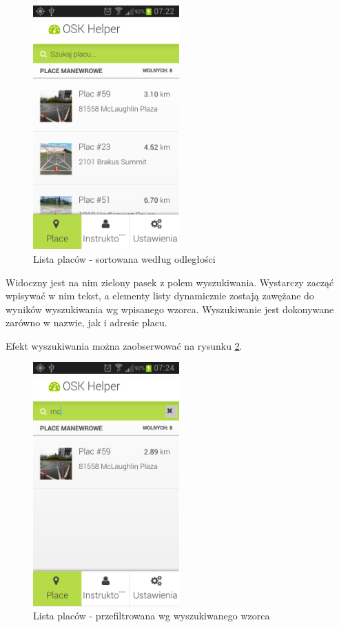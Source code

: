 \documentclass[twoside,a4paper,openright,12pt]{book}
\begin{document}
\begin{figure}[H]
\centering
\includegraphics[width=0.5\textwidth]{screenshots/android/lista_placow.png}
\caption{Lista placów - sortowana według odległości}
\label{fig:Lista_placow_mobile}
\end{figure}

Widoczny jest na nim zielony pasek z polem wyszukiwania. Wystarczy zacząć wpisywać w nim tekst, a elementy listy dynamicznie zostają zawężane do wyników wyszukiwania wg wpisanego wzorca. Wyszukiwanie jest dokonywane zarówno w nazwie, jak i adresie placu.

Efekt wyszukiwania można zaobserwować na rysunku \ref{fig:Lista_placow-przefiltrowana_mobile}.

\begin{figure}[H]
\centering
\includegraphics[width=0.5\textwidth]{screenshots/android/wyszukiwanie.png}
\caption{Lista placów - przefiltrowana wg wyszukiwanego wzorca}
\label{fig:Lista_placow-przefiltrowana_mobile}
\end{figure}
\end{document}
